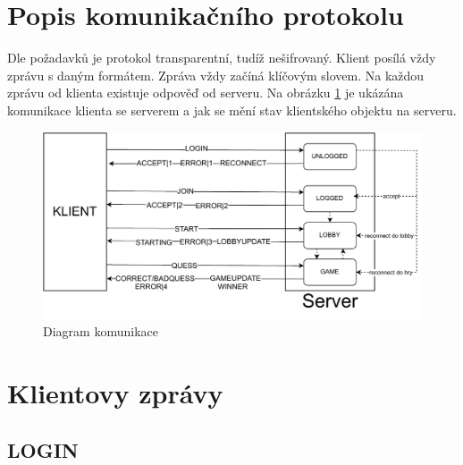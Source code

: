 \documentclass[12pt]{report}
\begin{document}
	\section{Popis komunikačního protokolu}
		Dle požadavků je protokol transparentní, tudíž nešifrovaný. Klient posílá vždy zprávu s daným formátem. Zpráva vždy začíná klíčovým slovem. Na každou zprávu od klienta existuje odpověď od serveru. Na obrázku \ref{fig:diagram} je ukázána komunikace klienta se serverem a jak se mění stav klientského objektu na serveru.
		
	\begin{figure}[h]
		\centering
		\includegraphics[width=.9\textwidth]{img/ups_diagram}
		\caption{Diagram komunikace}
		\label{fig:diagram}
	\end{figure}

	\section{Klientovy zprávy}
		\subsection{LOGIN}
		
\end{document}
